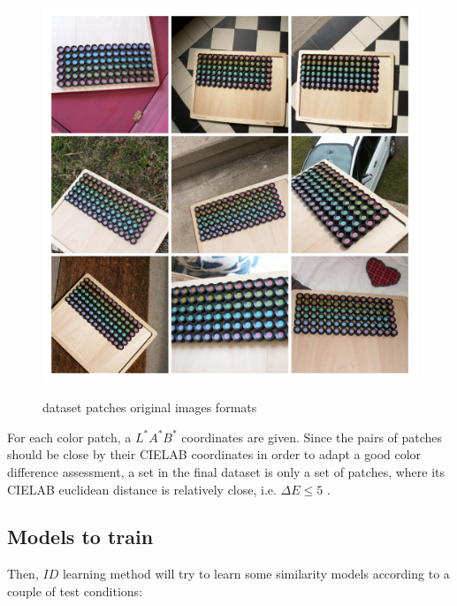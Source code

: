 \begin{figure}[H] \label{set_ds}
			\includegraphics[width=\linewidth,height=12cm,keepaspectratio]{Figures/set_ds}
			\caption[set ds]
			{dataset patches original images formats}
\end{figure}

For each color patch, a $L^*A^*B^*$ \cite{lab} coordinates are given. 
Since the pairs of patches should be close by their CIELAB \cite{CIELAB} coordinates in order to adapt a good color difference assessment, a set in the final dataset is only a set of patches, where its CIELAB euclidean distance is relatively close, i.e. $\Delta E \leq 5$ .




\subsection{Models to train}
Then, $ID$ learning method will try to learn some similarity models according to a couple of test conditions:

